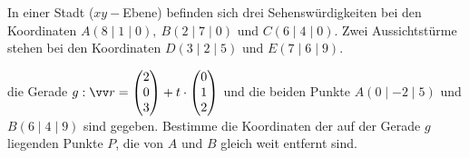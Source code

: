 \documentclass[11pt]{exam}
\begin{document}
\begin{questions}
\newpage
\noaddpoints
\question[\totalpoints]
\addpoints
In einer Stadt ($xy-$Ebene) befinden sich drei Sehenswürdigkeiten bei den Koordinaten $A(8\mid1\mid0),\: B(2\mid7\mid0)$ und $C(6\mid4\mid0)$. Zwei Aussichtstürme stehen bei den Koordinaten $D(3\mid2\mid5)$ und $E(7\mid6\mid9)$.


\newpage
\question[6] %
die Gerade ${g:\v{r}=\Vec{2}{0}{3}+t\*\Vec{0}{1}{2}}$ und die beiden Punkte $A(0\mid-2\mid5)$ und $B(6\mid4\mid9)$ sind gegeben. Bestimme die Koordinaten der auf der Gerade $g$ liegenden Punkte $P$, die von $A$ und $B$ gleich weit entfernt sind.


\end{questions}
\end{document}
